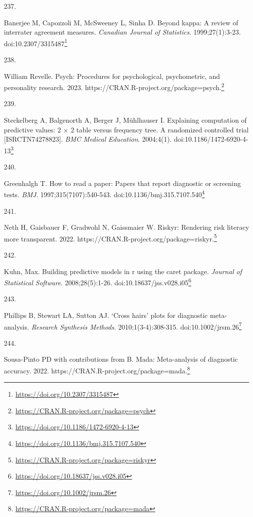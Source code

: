 \documentclass[
  a4paper,
]{book}
\newlength{\cslhangindent}
\newlength{\csllabelwidth}
\newlength{\cslentryspacingunit} %
\newenvironment{CSLReferences}[2] %
 {%
  \setlength{\parindent}{0pt}
  \ifodd #1
  \let\oldpar\par
  \def\par{\hangindent=\cslhangindent\oldpar}
  \fi
  \setlength{\parskip}{#2\cslentryspacingunit}
 }%
 {}
\newcommand{\CSLLeftMargin}[1]{\parbox[t]{\csllabelwidth}{#1}}
\newcommand{\CSLRightInline}[1]{\parbox[t]{\linewidth - \csllabelwidth}{#1}\break}
\renewcommand{\href}[2]{#2\footnote{\url{#1}}}
\begin{document}
\begin{CSLReferences}{0}{0}
\leavevmode{}%
\CSLLeftMargin{237. }%
\CSLRightInline{Banerjee M, Capozzoli M, McSweeney L, Sinha D. Beyond kappa: A review of interrater agreement measures. \emph{Canadian Journal of Statistics}. 1999;27(1):3-23. doi:\href{https://doi.org/10.2307/3315487}{10.2307/3315487}}

\leavevmode{}%
\CSLLeftMargin{238. }%
\CSLRightInline{William Revelle. Psych: Procedures for psychological, psychometric, and personality research. 2023. \href{https://CRAN.R-project.org/package=psych}{https://CRAN.R-project.org/package=psych.}}

\leavevmode{}%
\CSLLeftMargin{239. }%
\CSLRightInline{Steckelberg A, Balgenorth A, Berger J, Mühlhauser I. Explaining computation of predictive values: 2 × 2 table versus frequency tree. A randomized controlled trial {[}ISRCTN74278823{]}. \emph{BMC Medical Education}. 2004;4(1). doi:\href{https://doi.org/10.1186/1472-6920-4-13}{10.1186/1472-6920-4-13}}

\leavevmode{}%
\CSLLeftMargin{240. }%
\CSLRightInline{Greenhalgh T. How to read a paper: Papers that report diagnostic or screening tests. \emph{BMJ}. 1997;315(7107):540-543. doi:\href{https://doi.org/10.1136/bmj.315.7107.540}{10.1136/bmj.315.7107.540}}

\leavevmode{}%
\CSLLeftMargin{241. }%
\CSLRightInline{Neth H, Gaisbauer F, Gradwohl N, Gaissmaier W. Riskyr: Rendering risk literacy more transparent. 2022. \href{https://CRAN.R-project.org/package=riskyr}{https://CRAN.R-project.org/package=riskyr.}}

\leavevmode{}%
\CSLLeftMargin{242. }%
\CSLRightInline{Kuhn, Max. Building predictive models in r using the caret package. \emph{Journal of Statistical Software}. 2008;28(5):1-26. doi:\href{https://doi.org/10.18637/jss.v028.i05}{10.18637/jss.v028.i05}}

\leavevmode{}%
\CSLLeftMargin{243. }%
\CSLRightInline{Phillips B, Stewart LA, Sutton AJ. {`}Cross hairs{'} plots for diagnostic meta{-}analysis. \emph{Research Synthesis Methods}. 2010;1(3-4):308-315. doi:\href{https://doi.org/10.1002/jrsm.26}{10.1002/jrsm.26}}

\leavevmode{}%
\CSLLeftMargin{244. }%
\CSLRightInline{Sousa-Pinto PD with contributions from B. Mada: Meta-analysis of diagnostic accuracy. 2022. \href{https://CRAN.R-project.org/package=mada}{https://CRAN.R-project.org/package=mada.}}


\end{CSLReferences}
\end{document}
